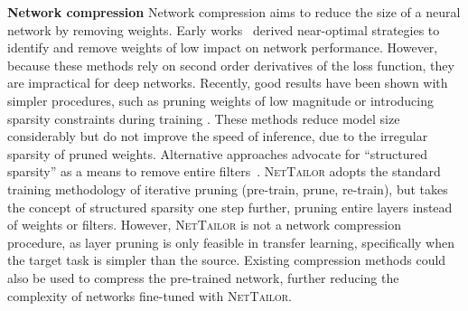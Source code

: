 \documentclass[10pt,twocolumn,letterpaper]{article}
\begin{document}
\noindent
{\bf Network compression}
Network compression aims to reduce the size of a neural network by removing weights. 
Early works~\cite{lecun1990optimal,hassibi1993second} derived near-optimal strategies to identify and remove weights of low impact on network performance. However, because these methods rely on second order derivatives of the loss function, they are impractical for deep networks.
Recently, good results have been shown with simpler procedures, such as pruning weights of low magnitude \cite{han2015learning} or introducing sparsity constraints during training \cite{zhou2016less}.
These methods reduce model size considerably but do not improve the speed of inference, due to the irregular sparsity of pruned weights. Alternative approaches advocate for ``structured sparsity'' as a means to remove entire filters~\cite{li2016pruning, molchanov2016pruning}.
\textsc{NetTailor} adopts the standard training methodology of iterative pruning (pre-train, prune, re-train), but takes the concept of structured sparsity one step further, pruning entire layers instead of weights or filters. 
However, \textsc{NetTailor} is not a network compression procedure, as layer pruning is only feasible in transfer learning, specifically when the target task is simpler than the source. 
Existing compression methods could also be used to compress the pre-trained network, further reducing the complexity of networks fine-tuned with \textsc{NetTailor}. 
\end{document}
